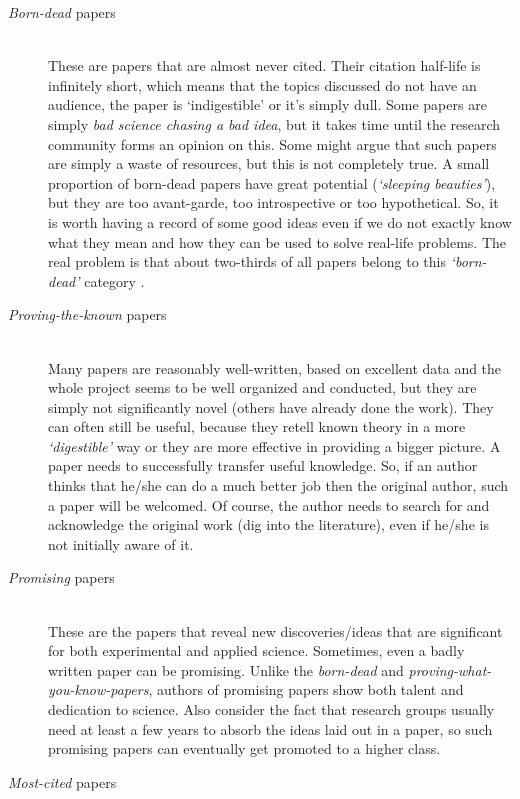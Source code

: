 \documentclass[graybox,envcountchap,sectrefs,UStrade]{svmono}
\begin{document}
\begin{description}
\item[\emph{Born-dead} papers]  \hfill \\
     These are papers that are almost never cited. Their citation half-life is infinitely short, which means that the topics discussed do not have an audience, the paper is `indigestible' or it's simply dull. Some papers are simply \emph{bad science chasing a bad idea}, but it takes time until the research community forms an opinion on this. Some might argue that such papers are simply a waste of resources, but this is not completely true. A small proportion of born-dead papers have great potential (\emph{`sleeping beauties'}), but they are too avant-garde, too introspective or too hypothetical. So, it is worth having a record of some good ideas even if we do not exactly know what they mean and how they can be used to solve real-life problems. The real problem is that about two-thirds of all papers belong to this \emph{`born-dead'} category \citep{Garfield1979S,Latour1987S}. \medskip
\item[\emph{Proving-the-known} papers]  \hfill \\
     Many papers are reasonably well-written, based on excellent data and the whole project seems to be well organized and conducted, but they are simply not significantly novel (others have already done the work). They can often still be useful, because they retell known theory in a more \emph{`digestible'} way or they are more effective in providing a bigger picture. A paper needs to successfully transfer useful knowledge. So, if an author thinks that he/she can do a much better job then the original author, such a paper will be welcomed. Of course, the author needs to search for and acknowledge the original work (dig into the literature), even if he/she is not initially aware of it.\medskip
\item[\emph{Promising} papers]  \hfill \\
     These are the papers that reveal new discoveries/ideas that are significant for both experimental and applied science. Sometimes, even a badly written paper can be promising. Unlike the \emph{born-dead} and \emph{proving-what-you-know-papers}, authors of promising papers show both talent and dedication to science. Also consider the fact that research groups usually need at least a few years to absorb the ideas laid out in a paper, so such promising papers can eventually get promoted to a higher class.\medskip
\item[\emph{Most-cited} papers]  \hfill \\

\end{description}
\end{document}
